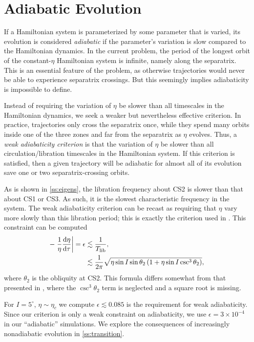 \documentclass[
        fleqn,
        usenatbib,
        referee,
    ]{mnras}
\newcommand*{\rd}[2]{\frac{\mathrm{d}#1}{\mathrm{d}#2}}
\newcommand*{\at}[1]{\left.#1\right|}
\newcommand*{\p}[1]{\left(#1\right)}
\begin{document}
\section{Adiabatic Evolution}\label{s:ad}

If a Hamiltonian system is parameterized by some parameter that is varied, its
evolution is considered \emph{adiabatic} if the parameter's variation is slow
compared to the Hamiltonian dynamics. In the current problem, the period of the
longest orbit of the constant-$\eta$ Hamiltonian system is infinite, namely
along the separatrix. This is an essential feature of the problem, as otherwise
trajectories would never be able to experience separatrix crossings. But this
seemingly implies adiabaticity is impossible to define.

Instead of requiring the variation of $\eta$ be slower than all timescales in
the Hamiltonian dynamics, we seek a weaker but nevertheless effective criterion.
In practice, trajectories only cross the separatrix once, while they spend many
orbits inside one of the three zones and far from the separatrix as $\eta$
evolves. Thus, a \emph{weak adiabaticity criterion} is that the variation of
$\eta$ be slower than all circulation/libration timescales in the Hamiltonian
system. If this criterion is satisfied, then a given trajectory will be
adiabatic for almost all of its evolution save one or two separatrix-crossing
orbits.

As is shown in \autoref{ss:eigens}, the libration frequency about CS2 is slower
than that about CS1 or CS3. As such, it is the slowest characteristic frequency
in the system. The weak adiabaticity criterion can be recast as requiring that
$\eta$ vary more slowly than this libration period; this is exactly the
criterion used in \citep{ward2004II,millholland_disk}. This constraint can be
computed
\begin{align}
    -\at{\frac{1}{\eta}\rd{\eta}{\tau}} = \epsilon &\lesssim
            \frac{1}{T_{\rm lib}},\\
        &\lesssim \frac{1}{2\pi}\sqrt{\eta\sin I \sin \theta_2
            \p{1 + \eta \sin I \csc^3 \theta_2}},
            \label{eq:ad_constr}
\end{align}
where $\theta_2$ is the obliquity at CS2. This formula differs somewhat from
that presented in \citet{millholland_disk}, where the $\csc^3\theta_2$ term is
neglected and a square root is missing.

For $I = 5^\circ$, $\eta \sim \eta_c$ we compute $\epsilon \lesssim 0.085$ is
the requirement for weak adiabaticity. Since our criterion is only a weak
constraint on adiabaticity, we use $\epsilon = 3 \times 10^{-4}$ in our
``adiabatic'' simulations. We explore the consequences of increasingly
nonadiabatic evolution in \autoref{ss:transition}.
\end{document}

